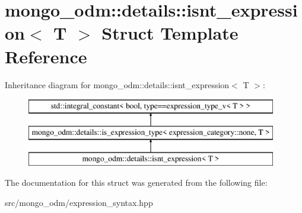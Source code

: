\hypertarget{structmongo__odm_1_1details_1_1isnt__expression}{}\section{mongo\+\_\+odm\+:\+:details\+:\+:isnt\+\_\+expression$<$ T $>$ Struct Template Reference}
\label{structmongo__odm_1_1details_1_1isnt__expression}
Inheritance diagram for mongo\+\_\+odm\+:\+:details\+:\+:isnt\+\_\+expression$<$ T $>$\+:\begin{figure}[H]
\begin{center}
\leavevmode
\includegraphics[height=3.000000cm]{structmongo__odm_1_1details_1_1isnt__expression}
\end{center}
\end{figure}


The documentation for this struct was generated from the following file\+:\begin{DoxyCompactItemize}
\item 
src/mongo\+\_\+odm/expression\+\_\+syntax.\+hpp\end{DoxyCompactItemize}
